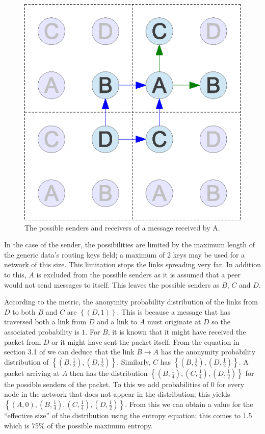 \documentclass[ %
                    author={Luke Murray},
                supervisor={Dr. Simon Hollis},
                     title={Shadow Peer-to-Peer Networks},
                  subtitle={},
                    degree={MEng},
                      year={2013} ]{thesis}
\begin{document}
\begin{figure}[h]
    \centering
    \includegraphics{diagrams/mix_analysis2.eps}
    \caption{The possible senders and receivers of a message received by A.}
    \label{entropy_send_recv}
\end{figure}

In the case of the sender, the possibilities are limited by the maximum length of the generic data's routing keys field; a maximum of 2 keys may be used for a network of this size. This limitation stops the links spreading very far. In addition to this, $A$ is excluded from the possible senders as it is assumed that a peer would not send messages to itself. This leaves the possible senders as $B$, $C$ and $D$.

According to the metric, the anonymity probability distribution of the links from $D$ to both $B$ and $C$ are $\left\{(D, 1)\right\}$. This is because a message that has traversed both a link from $D$ and a link to $A$ must originate at $D$ so the associated probability is $1$. For $B$, it is known that it might have received the packet from $D$ or it might have sent the packet itself. From the equation in section 3.1 of \cite{serjantov2003towards} we can deduce that the link $B \rightarrow A$ has the anonymity probability distribution of $\left\{(B, \frac{1}{2}), (D, \frac{1}{2})\right\}$. Similarly, $C$ has $\left\{(B, \frac{1}{2}), (D, \frac{1}{2})\right\}$. A packet arriving at $A$ then has the distribution $\left\{(B, \frac{1}{4}), (C, \frac{1}{4}), (D, \frac{1}{2})\right\}$ for the possible senders of the packet. To this we add probabilities of 0 for every node in the network that does not appear in the distribution; this yields $\left\{(A, 0), (B, \frac{1}{4}), (C, \frac{1}{4}), (D, \frac{1}{2})\right\}$. From this we can obtain a value for the ``effective size'' of the distribution using the entropy equation; this comes to 1.5 which is 75\% of the possible maximum entropy.
\end{document}
